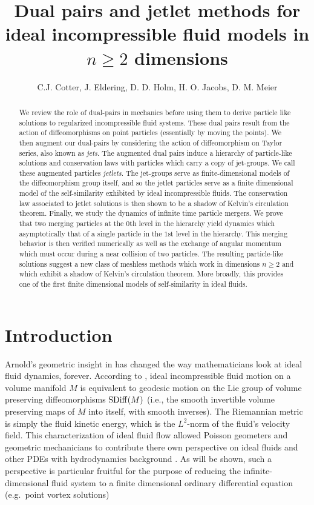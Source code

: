 \documentclass[12pt]{amsart}
\title[Dual pairs and jetlet methods for ideal fluids]%
{Dual pairs and jetlet methods for ideal incompressible fluid models in $n \geq 2$ dimensions}
\author{C.J. Cotter, J. Eldering, D. D. Holm, H. O. Jacobs, D. M. Meier}
\begin{document}
\maketitle

\begin{abstract}
  We review the role of dual-pairs in mechanics before using them
  to derive particle like solutions to regularized incompressible 
  fluid systems.
  These dual pairs result from the action of diffeomorphisms on point
  particles (essentially by moving the points).
  We then augment our dual-pairs by considering the action of diffeomorphism
  on Taylor series, also known as \emph{jets}.
  The augmented dual pairs induce a hierarchy of particle-like solutions
  and conservation laws
  with particles which carry a copy of jet-groups.
  We call these augmented particles \emph{jetlets}.
  The jet-groups serve as finite-dimensional models of the diffeomorphism
  group itself, and so the jetlet particles serve as a finite
  dimensional model of the self-similarity exhibited by ideal
  incompressible fluids.
  The conservation law associated to jetlet solutions is then
  shown to be a shadow of Kelvin's circulation theorem.
  Finally, we study the dynamics of infinite time particle mergers.
  We prove that two merging particles at the $0$th level in the hierarchy
  yield dynamics which asymptotically that of a single particle in the $1$st level in the hierarchy.
  This merging behavior is then verified numerically
  as well as the exchange of angular momentum which must
  occur during a near collision of two particles.
  The resulting particle-like solutions suggest a new class
  of meshless methods which work in dimensions $n \geq 2$
  and which exhibit a shadow of Kelvin's circulation theorem.
  More broadly, this provides one of the first finite dimensional models of
  self-similarity in ideal fluids.
\end{abstract}

\section{Introduction}
Arnold's geometric insight in \cite{Arnold1966}  has changed the way mathematicians look at ideal fluid dynamics, forever.  According to \cite{Arnold1966}, ideal incompressible fluid motion on a volume manifold $M$ is equivalent to geodesic motion on the Lie group of volume preserving diffeomorphisms ${\rm SDiff}(M)$ (i.e., the smooth invertible volume preserving maps of $M$ into itself, with smooth inverses).  The Riemannian metric is simply the fluid kinetic energy, which is the $L^2$-norm of the fluid's velocity field.
This characterization of ideal fluid flow allowed Poisson geometers and geometric mechanicians to contribute there own perspective on ideal fluids and other PDEs with hydrodynamics background \cite{EbinMarsden1970,MarsdenWeinstein1983,Zeitlin1991,ArnoldKhesin1998,HolmMarsdenRatiu1998,FoiasHolmTiti2001}.
As will be shown, such a perspective is particular fruitful for the purpose of reducing the infinite-dimensional fluid system
to a finite dimensional ordinary differential equation (e.g.\ point vortex solutions)
\end{document}
